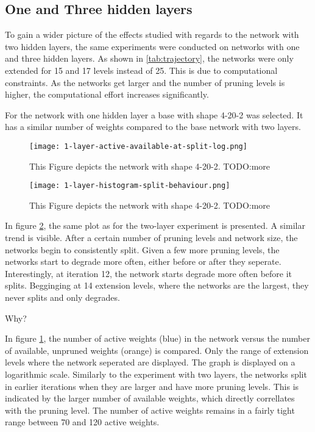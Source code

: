 \subsection{One and Three hidden layers}
To gain a wider picture of the effects studied with regards to the network with two hidden layers, the same experiments were conducted on networks with one and three hidden layers.
As shown in \ref{tab:trajectory}, the networks were only extended for 15 and 17 levels instead of 25. 
This is due to computational constraints. As the networks get larger and the number of pruning levels is higher, the computational effort increases significantly.

For the network with one hidden layer a base with shape 4-20-2 was selected.
It has a similar number of weights compared to the base network with two layers.

\begin{figure}[ht]
    \centering
    \texttt{[image: 1-layer-active-available-at-split-log.png]}
    \caption{This Figure depicts the network with shape 4-20-2.
    TODO:more }
    \label{fig:1layer-active}
\end{figure}

\begin{figure}[ht]
    \centering
    \texttt{[image: 1-layer-histogram-split-behaviour.png]}
    \caption{This Figure depicts the network with shape 4-20-2.
    TODO:more }
    \label{fig:1layer-histogram}
\end{figure}

In figure \ref{fig:1layer-histogram}, the same plot as for the two-layer experiment is presented.
A similar trend is visible.
After a certain number of pruning levels and network size, the networks begin to consistently split.
Given a few more pruning levels, the networks start to degrade more often, either before or after they seperate.
Interestingly, at iteration 12, the network starts degrade more often before it splits.
Begginging at 14 extension levels, where the networks are the largest, they never splits and only degrades.

Why? 

In figure \ref{fig:1layer-active}, the number of active weights (blue) in the network versus the number of available, unpruned weights (orange) is compared.
Only the range of extension levels where the network seperated are displayed.
The graph is displayed on a logarithmic scale.
Similarly to the experiment with two layers, the networks split in earlier iterations when they are larger and have more pruning levels.
This is indicated by the larger number of available weights, which directly correllates with the pruning level.
The number of active weights remains in a fairly tight range between 70 and 120 active weights.

